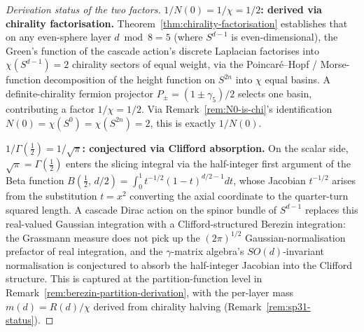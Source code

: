 \documentclass[12pt,a4paper]{article}
\begin{document}
\begin{proof}[Derivation status of the two factors]
\textbf{$1/N(0) = 1/\chi = 1/2$: derived via chirality factorisation.}
Theorem~\ref{thm:chirality-factorisation} establishes that on any
even-sphere layer $d\bmod 8 = 5$ (where $S^{d-1}$ is even-dimensional),
the Green's function of the cascade action's discrete Laplacian
factorises into $\chi(S^{d-1}) = 2$ chirality sectors of equal weight,
via the Poincar\'{e}--Hopf / Morse-function decomposition of the
height function on $S^{2n}$ into $\chi$ equal basins. A definite-chirality
fermion projector $P_\pm = (1\pm\gamma_5)/2$ selects one basin,
contributing a factor $1/\chi = 1/2$. Via
Remark~\ref{rem:N0-is-chi}'s identification
$N(0) = \chi(S^0) = \chi(S^{2n}) = 2$, this is exactly $1/N(0)$.

\textbf{$1/\Gamma(\tfrac{1}{2}) = 1/\sqrt{\pi}$: conjectured via
Clifford absorption.} On the scalar side, $\sqrt{\pi} = \Gamma(\tfrac{1}{2})$
enters the slicing integral via the half-integer first argument of the
Beta function $B(\tfrac{1}{2},\,d/2) = \int_0^1 t^{-1/2}(1-t)^{d/2-1}dt$,
whose Jacobian $t^{-1/2}$ arises from the substitution $t=x^2$
converting the axial coordinate to the quarter-turn squared length. A
cascade Dirac action on the spinor bundle of $S^{d-1}$ replaces this
real-valued Gaussian integration with a Clifford-structured Berezin
integration: the Grassmann measure does not pick up the $(2\pi)^{1/2}$
Gaussian-normalisation prefactor of real integration, and the
$\gamma$-matrix algebra's $SO(d)$-invariant normalisation is conjectured
to absorb the half-integer Jacobian into the Clifford structure. This
is captured at the partition-function level in
Remark~\ref{rem:berezin-partition-derivation}, with the per-layer mass
$m(d) = R(d)/\chi$ derived from chirality halving (Remark~\ref{rem:sp31-status}).
\end{proof}
\end{document}
